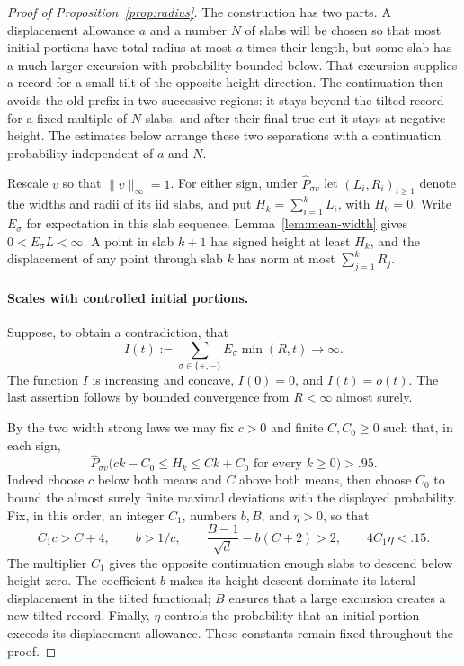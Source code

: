 \begin{proof}[Proof of Proposition~\ref{prop:radius}]
The construction has two parts.  A displacement allowance \(a\) and a
number \(N\) of slabs will be chosen so that most initial portions have
total radius at most \(a\) times their length, but some slab has a much
larger excursion with probability bounded below.  That excursion supplies
a record for a small tilt of the opposite height direction.  The
continuation then avoids the old prefix in two successive regions: it
stays beyond the tilted record for a fixed multiple of \(N\) slabs, and
after their final true cut it stays at negative height.  The estimates
below arrange these two separations with a continuation probability
independent of \(a\) and \(N\).

Rescale \(v\) so that \(\|v\|_\infty=1\).  For either sign, under
\(\widehat P_{\sigma v}\) let \((L_i,R_i)_{i\ge1}\) denote the widths
and radii of its iid slabs, and put \(H_k=\sum_{i=1}^kL_i\), with
\(H_0=0\).  Write \(E_\sigma\) for expectation in this slab sequence.
Lemma~\ref{lem:mean-width} gives
\(0<E_\sigma L<\infty\).  A point in slab \(k+1\) has signed height
at least \(H_k\), and the displacement of any point through slab
\(k\) has norm at most \(\sum_{j=1}^kR_j\).

\paragraph{Scales with controlled initial portions.}
Suppose, to obtain a contradiction, that
\[
 I(t):=\sum_{\sigma\in\{+,-\}}E_\sigma\min(R,t)
 \longrightarrow\infty.
\]
The function \(I\) is increasing and concave, \(I(0)=0\), and
\(I(t)=o(t)\).  The last assertion follows by bounded convergence from
\(R<\infty\) almost surely.

By the two width strong laws we may fix \(c>0\) and finite
\(C,C_0\ge0\) such that, in each sign,
\begin{equation}\label{eq:radius-height-bounds}
 \widehat P_{\sigma v}
 \bigl(ck-C_0\le H_k\le Ck+C_0\text{ for every }k\ge0\bigr)>.95.
\end{equation}
Indeed choose \(c\) below both means and \(C\) above both means, then
choose \(C_0\) to bound the almost surely finite maximal deviations
with the displayed probability.  Fix, in this order, an integer \(C_1\),
numbers \(b,B\), and \(\eta>0\), so that
\begin{equation}\label{eq:radius-constants}
 C_1c>C+4,\qquad b>1/c,\qquad
 \frac{B-1}{\sqrt d}-b(C+2)>2,\qquad 4C_1\eta<.15.
\end{equation}
The multiplier \(C_1\) gives the opposite continuation enough slabs to
descend below height zero.  The coefficient \(b\) makes its height
descent dominate its lateral displacement in the tilted functional;
\(B\) ensures that a large excursion creates a new tilted record.
Finally, \(\eta\) controls the probability that an initial portion exceeds
its displacement allowance.  These constants remain fixed throughout
the proof.


\end{proof}
